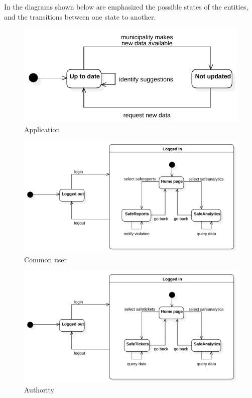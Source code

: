 \documentclass[a4paper]{article}
\begin{document}
In the diagrams shown below are emphasized the possible states of the
entities, and the transitions between one state to another.

\begin{figure}[H]
\centering
\includegraphics[width=\textwidth]{state_diagram_application}
\caption{Application}
\end{figure}

\begin{figure}[H]
\centering
\includegraphics[width=\textwidth]{state_diagram_common_user}
\caption{Common user}
\end{figure}

\begin{figure}[H]
\centering
\includegraphics[width=\textwidth]{state_diagram_authority}
\caption{Authority}
\end{figure}
\end{document}
